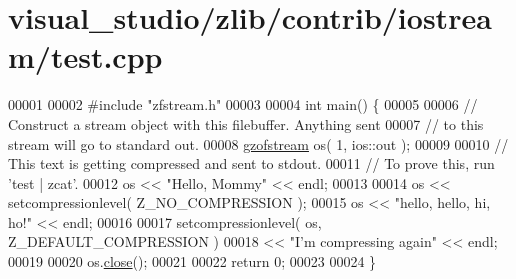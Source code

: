\hypertarget{visual__studio_2zlib_2contrib_2iostream_2test_8cpp_source}{}\section{visual\+\_\+studio/zlib/contrib/iostream/test.cpp}
\label{visual__studio_2zlib_2contrib_2iostream_2test_8cpp_source}

\begin{DoxyCode}
00001 
00002 \textcolor{preprocessor}{#include "zfstream.h"}
00003 
00004 \textcolor{keywordtype}{int} main() \{
00005 
00006   \textcolor{comment}{// Construct a stream object with this filebuffer.  Anything sent}
00007   \textcolor{comment}{// to this stream will go to standard out.}
00008   \hyperlink{classgzofstream}{gzofstream} os( 1, ios::out );
00009 
00010   \textcolor{comment}{// This text is getting compressed and sent to stdout.}
00011   \textcolor{comment}{// To prove this, run 'test | zcat'.}
00012   os << \textcolor{stringliteral}{"Hello, Mommy"} << endl;
00013 
00014   os << setcompressionlevel( Z\_NO\_COMPRESSION );
00015   os << \textcolor{stringliteral}{"hello, hello, hi, ho!"} << endl;
00016 
00017   setcompressionlevel( os, Z\_DEFAULT\_COMPRESSION )
00018     << \textcolor{stringliteral}{"I'm compressing again"} << endl;
00019 
00020   os.\hyperlink{classgzofstream_a59e8b01e1c9741085f18ca456c4b8f54}{close}();
00021 
00022   \textcolor{keywordflow}{return} 0;
00023 
00024 \}
\end{DoxyCode}

